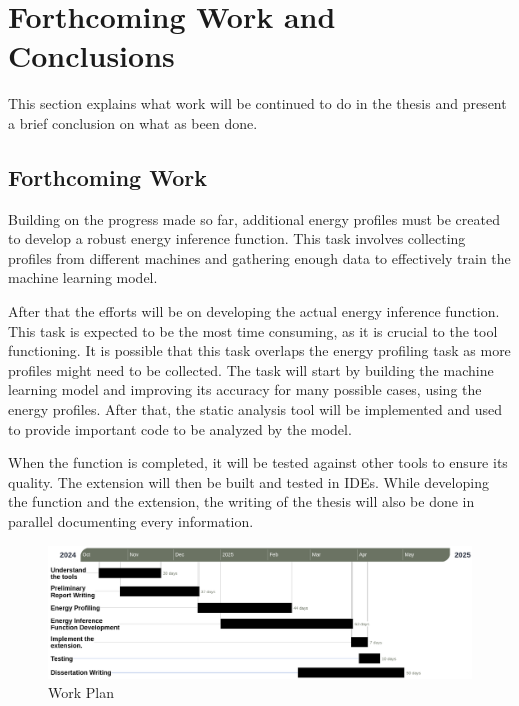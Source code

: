 \documentclass[sigplan]{acmart}
\begin{document}
\section{Forthcoming Work and Conclusions} \label{sec:forthcoming_work_and_conclusions}

This section explains what work will be continued to do in the thesis and present a brief conclusion on what as been done.

\subsection{Forthcoming Work}

Building on the progress made so far, additional energy profiles must be created to develop a robust energy inference function. This task involves collecting profiles from different machines and gathering enough data to effectively train the machine learning model.

After that the efforts will be on developing the actual energy inference function. This task is expected to be the most time consuming, as it is crucial to the tool functioning. It is possible that this task overlaps the energy profiling task as more profiles might need to be collected. The task will start by building the machine learning model and improving its accuracy for many possible cases, using the energy profiles. After that, the static analysis tool will be implemented and used to provide important code to be analyzed by the model.

When the function is completed, it will be tested against other tools to ensure its quality. The extension will then be built and tested in IDEs.
While developing the function and the extension, the writing of the thesis will also be done in parallel documenting every information.

\begin{figure}%
  \centering
  \includegraphics[width = 1 \textwidth]{figures/gantt_diagram.png}
  \caption{Work Plan}
  \label{fig:gantt_diagram}
\end{figure}
\end{document}

